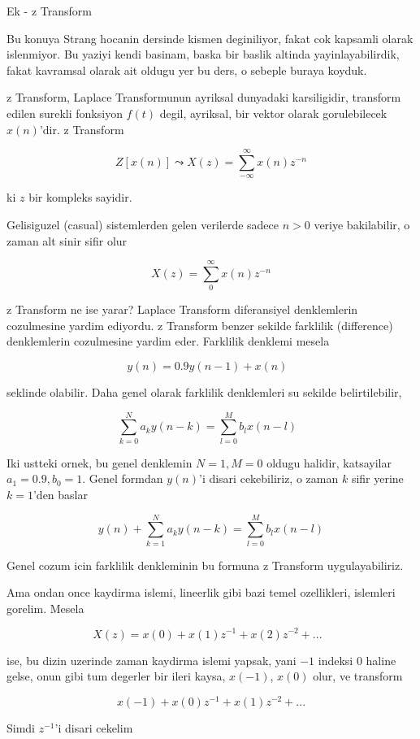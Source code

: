 \documentclass[12pt,fleqn]{article}
\begin{document}
Ek - z Transform 

Bu konuya Strang hocanin dersinde kismen deginiliyor, fakat cok kapsamli
olarak islenmiyor. Bu yaziyi kendi basinam, baska bir baslik altinda
yayinlayabilirdik, fakat kavramsal olarak ait oldugu yer bu ders, o sebeple
buraya koyduk.

z Transform, Laplace Transformunun ayriksal dunyadaki karsiligidir,
transform edilen surekli fonksiyon $f(t)$ degil, ayriksal, bir vektor
olarak gorulebilecek $x(n)$'dir. z Transform

\[ Z[x(n)] \leadsto X(z) = \sum_{-\infty}^{\infty} x(n)z^{-n}  \]

ki $z$ bir kompleks sayidir. 

Gelisiguzel (casual) sistemlerden gelen verilerde sadece $n>0$ veriye
bakilabilir, o zaman alt sinir sifir olur

\[ X(z) = \sum_{0}^{\infty} x(n)z^{-n}  \]

z Transform ne ise yarar? Laplace Transform diferansiyel denklemlerin
cozulmesine yardim ediyordu. z Transform benzer sekilde farklilik
(difference) denklemlerin cozulmesine yardim eder. Farklilik denklemi
mesela

\[ y(n) = 0.9 y(n-1) + x(n) 
\ \ \ \label{3}
\]

seklinde olabilir. Daha genel olarak farklilik denklemleri su sekilde
belirtilebilir,

\[ \sum_{k=0}^N a_k y(n-k) = \sum_{l=0}^M b_l x(n-l) 
\ \ \ \label{1}
\]

Iki ustteki ornek, bu genel denklemin $N=1,M=0$ oldugu halidir, katsayilar
$a_1 = 0.9,b_0=1$. Genel formdan $y(n)$'i disari cekebiliriz, o zaman
$k$ sifir yerine $k=1$'den baslar

\[ y(n) + \sum_{k=1}^N a_k y(n-k) = \sum_{l=0}^M b_l x(n-l) \]

Genel cozum icin farklilik denkleminin bu formuna z Transform
uygulayabiliriz. 

Ama ondan once kaydirma islemi, lineerlik gibi bazi temel ozellikleri,
islemleri gorelim. Mesela

\[ X(z) = x(0) + x(1)z^{-1} + x(2) z^{-2} + ... 
\ \ \ \label{2}
\]

ise, bu dizin uzerinde zaman kaydirma islemi yapsak, yani $-1$ indeksi $0$
haline gelse, onun gibi tum degerler bir ileri kaysa, $x(-1)$, $x(0)$ olur,
ve transform

\[ x(-1) + x(0)z^{-1} + x(1) z^{-2} + ...\]

Simdi $z^{-1}$'i disari cekelim
\end{document}
